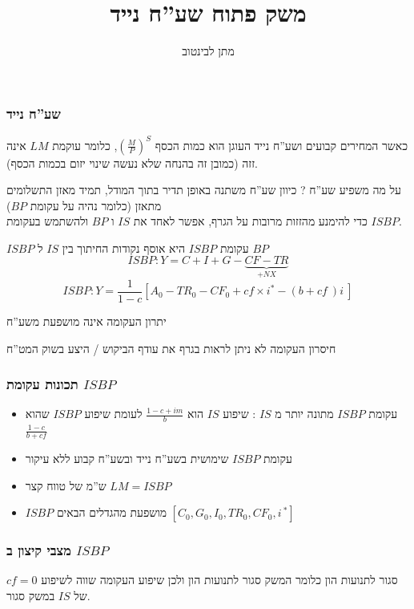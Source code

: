 \documentclass[usenames,dvipsnames]{beamer}
\title[]{משק פתוח שע''ח נייד}
\author{מתן לבינטוב}
\institute[{{ אב"ג}}]{{ אוניברסיטת בן גוריון בנגב}}
\date{}
\begin{document}
\begin{RTL}
\begin{frame}
\titlepage
\end{frame}
\begin{frame}[allowframebreaks]
    \frametitle{שע''ח נייד}
    כאשר המחירים קבועים ושע''ח נייד העוגן הוא כמות הכסף $\left(\frac{M}{P}\right)^S$, כלומר עוקמת $LM$ אינה זזה (כמובן זה בהנחה שלא נעשה שינוי יזום בכמות הכסף).
    \begin{block}{על מה משפיע שע''ח ?}
        כיוון שע''ח משתנה באופן תדיר בתוך המודל, תמיד מאזן התשלומים מתאזן (כלומר נהיה על עקומת $BP$) \\
        כדי להימנע מהזזות מרובות על הגרף, אפשר לאחד את $IS$ ו $BP$ ולהשתמש בעקומת $ISBP$.
    \end{block}


    \framebreak

    \begin{block}{$ISBP$}
        עקומת $ISBP$ היא אוסף נקודות החיתוך בין $IS$ ל $BP$
        $$ISBP : Y = C + I + G  - \underbrace{CF - TR}_{+NX}$$
        $$ISBP : Y =  \frac{1}{1-c} \left[A_0 - TR_0 - CF_0 + cf \times i^* - \left(b+cf \ \right)i \ \right]$$
    \end{block}
    \begin{exampleblock}{יתרון העקומה}
        אינה מושפעת משע''ח 
    \end{exampleblock}
    \begin{alertblock}{חיסרון העקומה}
        לא ניתן לראות בגרף את עודף הביקוש / היצע בשוק המט''ח
    \end{alertblock}    
\end{frame}
\begin{frame}[allowframebreaks]
    \frametitle{תכונות עקומת $ISBP$}
    \begin{itemize}
        \item עקומת $ISBP$ מתונה יותר מ $IS$ : שיפוע $IS$ הוא $\frac{1-c+im}{b}$ לעומת שיפוע $ISBP$ שהוא $\frac{1-c}{b + cf}$
        \item עקומת $ISBP$ שימושית בשע''ח נייד ובשע''ח קבוע ללא עיקור
        \item ש''מ של טווח קצר $LM = ISBP$
        \item $ISBP$ מושפעת מהגדלים הבאים $\left[C_0, G_0, I_0, TR_0 , CF_0, i^{\ *}  \right]$
    \end{itemize}

    

\end{frame}

\begin{frame}
    \frametitle{מצבי קיצון ב $ISBP$}
    \begin{block}{$cf = 0$ סגור לתנועות הון}
        כלומר המשק סגור לתנועות הון ולכן שיפוע העקומה שווה לשיפוע של $IS$ במשק סגור.
        

\end{block}
\end{frame}
\end{RTL}
\end{document}
